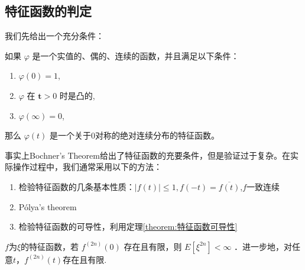 \subsection{特征函数的判定}
我们先给出一个充分条件：
\begin{theorem}
    如果 $\varphi$ 是一个实值的、偶的、连续的函数，并且满足以下条件：
    \begin{enumerate}
        \item $\varphi(0)=1$,
        \item $\varphi$ 在 $\boldsymbol{t}>0$ 时是凸的,
        \item $\varphi(\infty)=0$,
    \end{enumerate}
    那么 $\varphi(t)$ 是一个关于0对称的绝对连续分布的特征函数。
\end{theorem}
\begin{kaobox}
    事实上Bochner's Theorem给出了特征函数的充要条件，但是验证过于复杂。在实际操作过程中，我们通常采用以下的方法：
    \begin{enumerate}
        \item 检验特征函数的几条基本性质：$|f(t)|\le 1,f(-t)=\overline{f(t)}$,$f$一致连续
        \item Pólya's theorem
        \item 检验特征函数的可导性，利用定理\ref{theorem:特征函数可导性}
    \end{enumerate}
\end{kaobox}
\begin{theorem}\label{theorem:特征函数可导性}
    $f$为$\xi$的特征函数，若 $f^{(2 n)}(0)$ 存在且有限，则 $E\left[\xi^{2 n}\right]<\infty$ ．进一步地，对任意$t$，$f^{(2n)}(t)$存在且有限.
\end{theorem}
